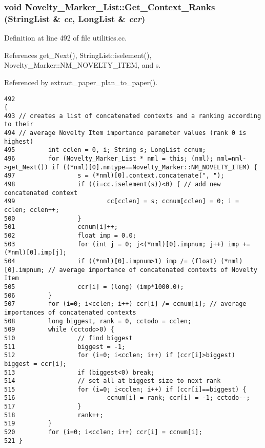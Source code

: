\subsubsection{\setlength{\rightskip}{0pt plus 5cm}void Novelty\_\-Marker\_\-List::Get\_\-Context\_\-Ranks ({\bf String\-List} \& {\em cc}, {\bf Long\-List} \& {\em ccr})}\label{classNovelty__Marker__List_a10}




Definition at line 492 of file utilities.cc.

References get\_\-Next(), String\-List::iselement(), Novelty\_\-Marker::NM\_\-NOVELTY\_\-ITEM, and s.

Referenced by extract\_\-paper\_\-plan\_\-to\_\-paper().



\footnotesize\begin{verbatim}492                                                                            {
493 // creates a list of concatenated contexts and a ranking according to their
494 // average Novelty Item importance parameter values (rank 0 is highest)
495         int cclen = 0, i; String s; LongList ccnum;
496         for (Novelty_Marker_List * nml = this; (nml); nml=nml->get_Next()) if ((*nml)[0].nmtype==Novelty_Marker::NM_NOVELTY_ITEM) {
497                 s = (*nml)[0].context.concatenate(", ");
498                 if ((i=cc.iselement(s))<0) { // add new concatenated context
499                         cc[cclen] = s; ccnum[cclen] = 0; i = cclen; cclen++;
500                 }
501                 ccnum[i]++;
502                 float imp = 0.0;
503                 for (int j = 0; j<(*nml)[0].impnum; j++) imp += (*nml)[0].imp[j];
504                 if ((*nml)[0].impnum>1) imp /= (float) (*nml)[0].impnum; // average importance of concatenated contexts of Novelty Item
505                 ccr[i] = (long) (imp*1000.0);
506         }
507         for (i=0; i<cclen; i++) ccr[i] /= ccnum[i]; // average importances of concatenated contexts
508         long biggest, rank = 0, cctodo = cclen;
509         while (cctodo>0) {
510                 // find biggest
511                 biggest = -1;
512                 for (i=0; i<cclen; i++) if (ccr[i]>biggest) biggest = ccr[i];
513                 if (biggest<0) break;
514                 // set all at biggest size to next rank
515                 for (i=0; i<cclen; i++) if (ccr[i]==biggest) {
516                         ccnum[i] = rank; ccr[i] = -1; cctodo--;
517                 }
518                 rank++;
519         }
520         for (i=0; i<cclen; i++) ccr[i] = ccnum[i];
521 }
\end{verbatim}\normalsize 
{}
